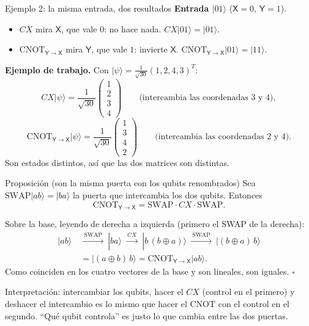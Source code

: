 \documentclass[11pt, a4paper, twoside, openright]{report}
\providecommand{\ket}[1]{|#1\rangle}
\newcommand{\X}{\mathsf{X}}
\newcommand{\Y}{\mathsf{Y}}
\newcommand{\CYX}{\mathrm{CNOT}_{\Y\to\X}}
\begin{document}
\begin{ejemplo}{Ejemplo 2: la misma entrada, dos resultados}
\textbf{Entrada $\ket{01}$} ($\X=0$, $\Y=1$).
\begin{itemize}
  \item $CX$ mira $\X$, que vale $0$: no hace nada. $CX\ket{01}=\ket{01}$.
  \item $\CYX$ mira $\Y$, que vale $1$: invierte $\X$. $\CYX\ket{01}=\ket{11}$.
\end{itemize}
\textbf{Ejemplo de trabajo.} Con $\ket\psi=\frac{1}{\sqrt{30}}(1,2,4,3)^T$:
\[
CX\ket\psi=\frac{1}{\sqrt{30}}\begin{pmatrix}1\\2\\3\\4\end{pmatrix}
\qquad\text{(intercambia las coordenadas 3 y 4)},
\]
\[
\CYX\ket\psi=\frac{1}{\sqrt{30}}\begin{pmatrix}1\\3\\4\\2\end{pmatrix}
\qquad\text{(intercambia las coordenadas 2 y 4)}.
\]
Son estados distintos, así que las dos matrices son distintas.
\end{ejemplo}

\begin{teoria}{Proposición (son la misma puerta con los qubits renombrados)}
Sea $\mathrm{SWAP}\ket{ab}=\ket{ba}$ la puerta que intercambia los dos qubits. Entonces
\[
\CYX=\mathrm{SWAP}\cdot CX\cdot\mathrm{SWAP}.
\]
\end{teoria}

\begin{demo}
Sobre la base, leyendo de derecha a izquierda (primero el SWAP de la derecha):
\[
\begin{aligned}
\ket{ab}\ &\xrightarrow{\ \mathrm{SWAP}\ }\ \ket{ba}\ \xrightarrow{\ CX\ }\ \ket{b\,(b\oplus a)}\ \xrightarrow{\ \mathrm{SWAP}\ }\ \ket{(b\oplus a)\,b}\\
&=\ket{(a\oplus b)\,b}=\CYX\ket{ab}.
\end{aligned}
\]
Como coinciden en los cuatro vectores de la base y son lineales, son iguales. \hfill$\square$

\smallskip
Interpretación: intercambiar los qubits, hacer el $CX$ (control en el primero) y deshacer el intercambio es lo mismo que hacer el CNOT con el control en el segundo. ``Qué qubit controla'' es justo lo que cambia entre las dos puertas.
\end{demo}
\end{document}
